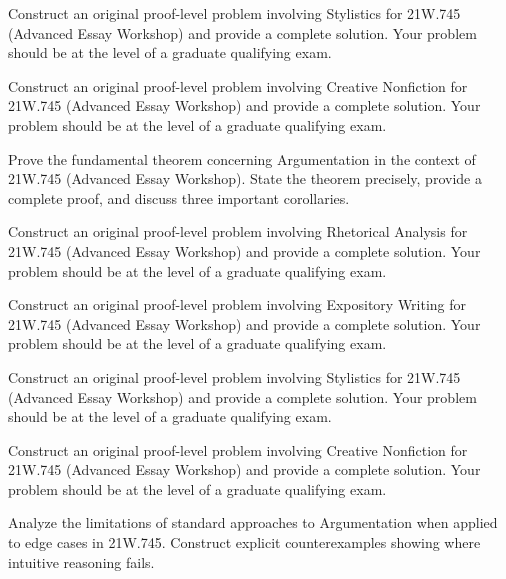 \documentclass[12pt,a4paper]{exam}
\begin{document}
\begin{questions}
\vspace{0.3cm}

\question[2]
Construct an original proof-level problem involving Stylistics for 21W.745 (Advanced Essay Workshop) and provide a complete solution. Your problem should be at the level of a graduate qualifying exam.

\vspace{0.3cm}

\question[3]
Construct an original proof-level problem involving Creative Nonfiction for 21W.745 (Advanced Essay Workshop) and provide a complete solution. Your problem should be at the level of a graduate qualifying exam.

\vspace{0.3cm}

\question[5]
Prove the fundamental theorem concerning Argumentation in the context of 21W.745 (Advanced Essay Workshop). State the theorem precisely, provide a complete proof, and discuss three important corollaries.

\vspace{0.3cm}

\question[5]
Construct an original proof-level problem involving Rhetorical Analysis for 21W.745 (Advanced Essay Workshop) and provide a complete solution. Your problem should be at the level of a graduate qualifying exam.

\vspace{0.3cm}

\question[3]
Construct an original proof-level problem involving Expository Writing for 21W.745 (Advanced Essay Workshop) and provide a complete solution. Your problem should be at the level of a graduate qualifying exam.

\vspace{0.3cm}

\question[5]
Construct an original proof-level problem involving Stylistics for 21W.745 (Advanced Essay Workshop) and provide a complete solution. Your problem should be at the level of a graduate qualifying exam.

\vspace{0.3cm}

\question[5]
Construct an original proof-level problem involving Creative Nonfiction for 21W.745 (Advanced Essay Workshop) and provide a complete solution. Your problem should be at the level of a graduate qualifying exam.

\vspace{0.3cm}

\question[8]
Analyze the limitations of standard approaches to Argumentation when applied to edge cases in 21W.745. Construct explicit counterexamples showing where intuitive reasoning fails.


\end{questions}
\end{document}
